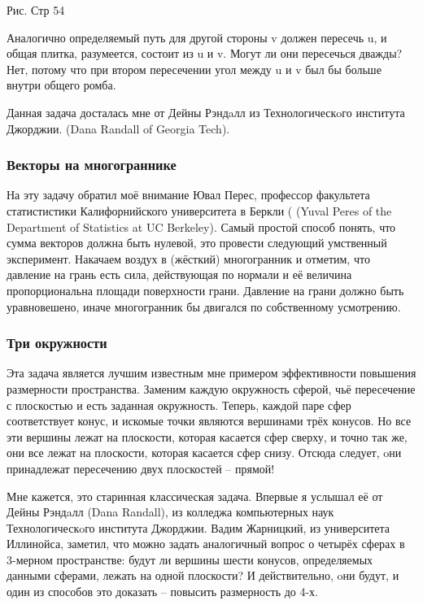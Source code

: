 Рис. Стр 54


Аналогично определяемый путь для другой стороны v должен пересечь u, и общая плитка, разумеется, состоит из u и v.
Могут ли они пересечься дважды? Нет, потому что при втором пересечении угол между u и v был бы больше внутри общего ромба.

Данная задача досталась мне от Дейны Рэндaлл из Технологическoго института Джорджии.
(Dana Randall of Georgia Tech).

\subsubsection*{Векторы на многограннике}%

На эту задачу обратил моё внимание Ювал Перес, профессор факультета статистистики Калифорнийского университета в Беркли ( (Yuval Peres of the Department of Statistics at UC Berkeley).
Самый простой способ понять, что сумма векторов должна быть нулевой, это провести следующий умственный эксперимент.
Накачаем воздух в (жёсткий) многогранник и отметим, что давление на грань есть сила, действующая по нормали и её величина пропорциональна площади поверхности грани.
Давление на грани должно быть уравновешено, иначе многогранник бы двигался по собственному усмотрению.

\subsubsection*{Три окружности}%

Эта задача является лучшим известным мне примером эффективности повышения размерности пространства.
Заменим каждую окружность сферой, чьё пересечение с плоскостью и есть заданная окружность.
Теперь, каждой паре сфер соответствует конус, и искомые точки являются вершинами трёх конусов.
Но все эти вершины лежат на плоскости, которая касается сфер сверху, и точно так
же, они все лежат на плоскости, которая касается сфер снизу.
Отсюда следует, 
oни принадлежат пересечению двух плоскостей -- прямой! 

Мне кажется, это старинная классическая задача.
Впервые я услышал её от Дейны Рэндaлл (Dana Randall), из колледжа компьютерных наук Технологическoго института Джорджии.
Вадим Жарницкий, из университета Иллинойса, заметил, что можно задать аналогичный вопрос о четырёх сферах в 3-мерном пространстве: будут ли вершины шести конусов, определяемых данными сферами, лежать на одной плоскости? И действительно, oни будут, и один из способов это доказать -- повысить размерность до 4-х.

